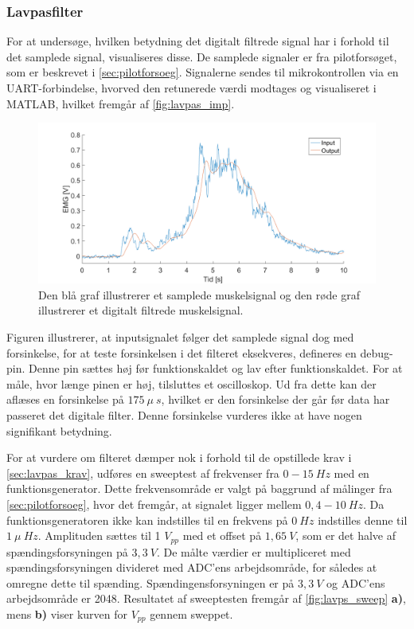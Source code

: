 \subsubsection{Lavpasfilter}
For at undersøge, hvilken betydning det digitalt filtrede signal har i forhold til det samplede signal, visualiseres disse. De samplede signaler er fra pilotforsøget, som er beskrevet i \autoref{sec:pilotforsoeg}. Signalerne sendes til mikrokontrollen via en UART-forbindelse, hvorved den retunerede værdi modtages og visualiseret i MATLAB, hvilket fremgår af \autoref{fig:lavpas_imp}.

\begin{figure}[H]
\centering
\includegraphics[width=1\textwidth]{figures/EMG_test}
\caption{Den blå graf illustrerer et samplede muskelsignal og den røde graf illustrerer et digitalt filtrede muskelsignal.}
\label{fig:lavpas_imp}
\end{figure}

\noindent
Figuren illustrerer, at inputsignalet følger det samplede signal dog med forsinkelse, for at teste forsinkelsen i det filteret eksekveres, defineres en debug-pin. Denne pin sættes høj før funktionskaldet og lav efter funktionskaldet. For at måle, hvor længe pinen er høj, tilsluttes et oscilloskop. Ud fra dette kan der aflæses en forsinkelse på $175~\mu~s$, hvilket er den forsinkelse der går før data har passeret det digitale filter. Denne forsinkelse vurderes ikke at have nogen signifikant betydning.

For at vurdere om filteret dæmper nok i forhold til de opstillede krav i \autoref{sec:lavpas_krav}, udføres en sweeptest af frekvenser fra $0-15~Hz$ med en funktionsgenerator. Dette frekvensområde er valgt på baggrund af målinger fra \autoref{sec:pilotforsoeg}, hvor det fremgår, at signalet ligger mellem $0,4-10~Hz$.  Da funktionsgeneratoren ikke kan indstilles til en frekvens på $0~Hz$ indstilles denne til $1~\mu~Hz$. Amplituden sættes til 1 $V_{pp}$ med et offset på $1,65~V$, som er det halve af spændingsforsyningen på $3,3~V$. De målte værdier er multipliceret med spændingsforsyningen divideret med ADC'ens arbejdsområde, for således at omregne dette til spænding. Spændingensforsyningen er på $3,3~V$ og ADC'ens arbejdsområde er 2048. Resultatet af sweeptesten fremgår af \autoref{fig:lavps_sweep} \textbf{a)}, mens \textbf{b)} viser kurven for $V_{pp}$ gennem sweppet.

